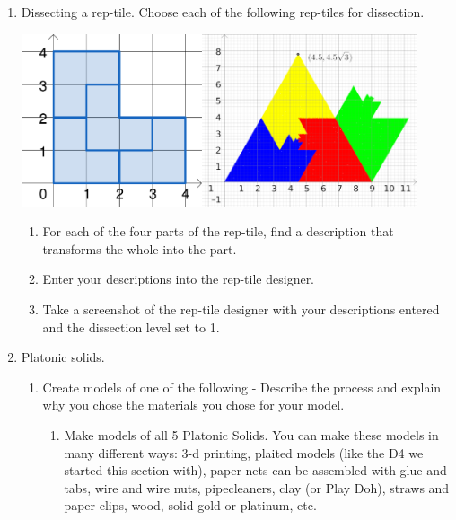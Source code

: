 \begin{enumerate}
\item Dissecting a rep-tile. Choose each of the following rep-tiles for dissection.
\begin{center}
    \includegraphics[height=2in]{images/rep-tiles-25}\hspace{.5in}\includegraphics[height=2in]{images/rep-tiles-30}
\end{center}
\begin{enumerate}
\item For each of the four parts of the rep-tile, find a description that transforms the whole into the part.
\item Enter your descriptions into the rep-tile designer.
\item Take a screenshot of the rep-tile designer with your descriptions entered and the dissection level set to 1.
\end{enumerate}


\item Platonic solids.
  \begin{enumerate}
  \item Create models of one of the following - Describe the process and explain why you chose the materials you chose for your model.
\begin {enumerate}
	\item Make models of all 5 Platonic Solids. You can make these models in many different ways:  3-d printing, plaited models (like the D4 we started this section with), paper nets can be assembled with glue and tabs, wire and wire nuts, pipecleaners, clay (or Play Doh), straws and paper clips, wood, solid gold or platinum, etc.
    

\end{enumerate}
\end{enumerate}
\end{enumerate}
